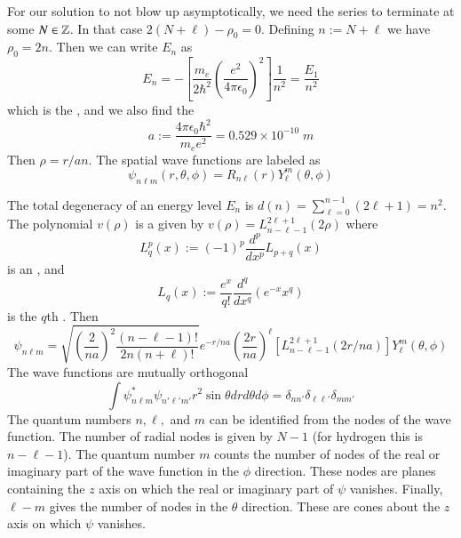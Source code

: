 \documentclass[12pt, a4paper, oneside, openright, titlepage]{book}
\begin{document}
For our solution to not blow up asymptotically, we need the series to terminate at some $N \in \mathbb Z$. In that case $2(N+\ell)-\rho_0 = 0$. Defining $n := N+\ell$ we have $\rho_0 = 2n$. Then we can write $E_n$ as \begin{equation*}
    \boxed{E_n = -\left[\frac{m_e}{2\hbar^2}\left(\frac{e^2}{4\pi\epsilon_0}\right)^2\right]\frac{1}{n^2} = \frac{E_1}{n^2}}
\end{equation*}
which is the , and we also find the  \begin{equation*}
    \boxed{a := \frac{4\pi\epsilon_0\hbar^2}{m_ee^2}=0.529\times 10^{-10}\;m}
\end{equation*}
Then $\rho = r/an$. The spatial wave functions are labeled as \begin{equation*}
    \psi_{n\ell m}(r,\theta,\phi) = R_{n\ell}(r)Y_{\ell}^m(\theta,\phi)
\end{equation*}


The total degeneracy of an energy level $E_n$ is $d(n) = \sum_{\ell=0}^{n-1}(2\ell+1)=n^2$. The polynomial $v(\rho)$ is a given by $v(\rho) = L_{n-\ell-1}^{2\ell+1}(2\rho)$ where \begin{equation*}
    L_q^p(x) := (-1)^p\frac{d^p}{dx^p}L_{p+q}(x)
\end{equation*} 
is an , and \begin{equation*}
    L_q(x) := \frac{e^x}{q!}\frac{d^q}{dx^q}(e^{-x}x^q)
\end{equation*}
is the $q$th . Then \begin{equation*}
    \boxed{\psi_{n\ell m} = \sqrt{\left(\frac{2}{na}\right)^2\frac{(n-\ell-1)!}{2n(n+\ell)!}}e^{-r/na}\left(\frac{2r}{na}\right)^{\ell}\left[L_{n-\ell-1}^{2\ell+1}(2r/na)\right]Y_{\ell}^m(\theta,\phi)}
\end{equation*}
The wave functions are mutually orthogonal \begin{equation*}
    \int \psi_{n\ell m}^*\psi_{n'\ell'm'}r^2\sin\theta drd\theta d\phi = \delta_{nn'}\delta_{\ell\ell'}\delta_{mm'}
\end{equation*}
The quantum numbers $n,\ell,$ and $m$ can be identified from the nodes of the wave function. The number of radial nodes is given by $N-1$ (for hydrogen this is $n-\ell-1$). The quantum number $m$ counts the number of nodes of the real or imaginary part of the wave function in the $\phi$ direction. These nodes are planes containing the $z$ axis on which the real or imaginary part of $\psi$ vanishes. Finally, $\ell-m$ gives the number of nodes in the $\theta$ direction. These are cones about the $z$ axis on which $\psi$ vanishes.
\end{document}
